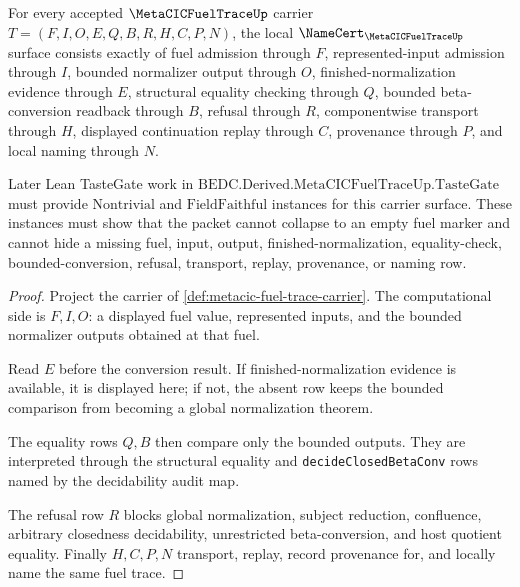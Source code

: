 \begin{theorem}
\label{thm:metacic-fuel-trace-namecert-obligations}
For every accepted $\MetaCICFuelTraceUp$ carrier $T=(F,I,O,E,Q,B,R,H,C,P,N)$, the local $\NameCert_{\MetaCICFuelTraceUp}$ surface consists exactly of fuel admission through $F$, represented-input admission through $I$, bounded normalizer output through $O$, finished-normalization evidence through $E$, structural equality checking through $Q$, bounded beta-conversion readback through $B$, refusal through $R$, componentwise transport through $H$, displayed continuation replay through $C$, provenance through $P$, and local naming through $N$.

Later Lean TasteGate work in $\mathrm{BEDC.Derived.MetaCICFuelTraceUp.TasteGate}$ must provide $\mathrm{Nontrivial}$ and $\mathrm{FieldFaithful}$ instances for this carrier surface. These instances must show that the packet cannot collapse to an empty fuel marker and cannot hide a missing fuel, input, output, finished-normalization, equality-check, bounded-conversion, refusal, transport, replay, provenance, or naming row.
\end{theorem}
\begin{proof}
Project the carrier of \autoref{def:metacic-fuel-trace-carrier}. The computational side is $F,I,O$: a displayed fuel value, represented inputs, and the bounded normalizer outputs obtained at that fuel.

Read $E$ before the conversion result. If finished-normalization evidence is available, it is displayed here; if not, the absent row keeps the bounded comparison from becoming a global normalization theorem.

The equality rows $Q,B$ then compare only the bounded outputs. They are interpreted through the structural equality and \texttt{decideClosedBetaConv} rows named by the decidability audit map.

The refusal row $R$ blocks global normalization, subject reduction, confluence, arbitrary closedness decidability, unrestricted beta-conversion, and host quotient equality. Finally $H,C,P,N$ transport, replay, record provenance for, and locally name the same fuel trace.
\end{proof}

